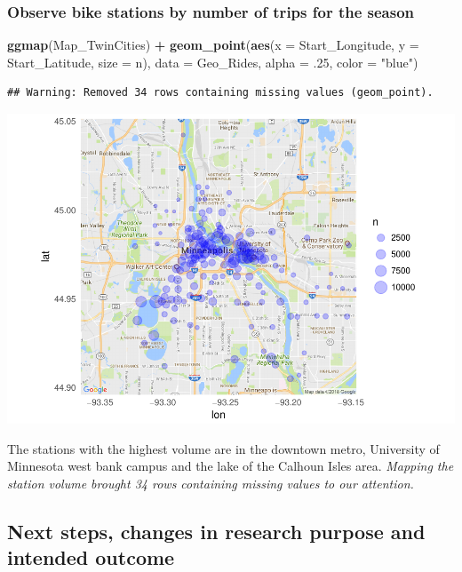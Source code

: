 \documentclass[]{article}
\newenvironment{Shaded}{\begin{snugshade}}{\end{snugshade}}
\newcommand{\KeywordTok}[1]{\textcolor[rgb]{0.13,0.29,0.53}{\textbf{#1}}}
\newcommand{\DataTypeTok}[1]{\textcolor[rgb]{0.13,0.29,0.53}{#1}}
\newcommand{\DecValTok}[1]{\textcolor[rgb]{0.00,0.00,0.81}{#1}}
\newcommand{\StringTok}[1]{\textcolor[rgb]{0.31,0.60,0.02}{#1}}
\newcommand{\OperatorTok}[1]{\textcolor[rgb]{0.81,0.36,0.00}{\textbf{#1}}}
\newcommand{\NormalTok}[1]{#1}
\begin{document}
\subsubsection{Observe bike stations by number of trips for the
season}\label{observe-bike-stations-by-number-of-trips-for-the-season}

\begin{Shaded}
\begin{Highlighting}[]
\KeywordTok{ggmap}\NormalTok{(Map_TwinCities) }\OperatorTok{+}\StringTok{ }\KeywordTok{geom_point}\NormalTok{(}\KeywordTok{aes}\NormalTok{(}\DataTypeTok{x =}\NormalTok{ Start_Longitude, }\DataTypeTok{y =}\NormalTok{ Start_Latitude, }\DataTypeTok{size =}\NormalTok{ n), }\DataTypeTok{data =}\NormalTok{ Geo_Rides, }\DataTypeTok{alpha =}\NormalTok{ .}\DecValTok{25}\NormalTok{, }\DataTypeTok{color =} \StringTok{"blue"}\NormalTok{)}
\end{Highlighting}
\end{Shaded}

\begin{verbatim}
## Warning: Removed 34 rows containing missing values (geom_point).
\end{verbatim}

\includegraphics{Nice_Ride_Project_Stat_ReportDRAFT_files/figure-latex/unnamed-chunk-18-1.pdf}

The stations with the highest volume are in the downtown metro,
University of Minnesota west bank campus and the lake of the Calhoun
Isles area. \emph{Mapping the station volume brought 34 rows containing
missing values to our attention.}

\subsection{Next steps, changes in research purpose and intended
outcome}\label{next-steps-changes-in-research-purpose-and-intended-outcome}
\end{document}
